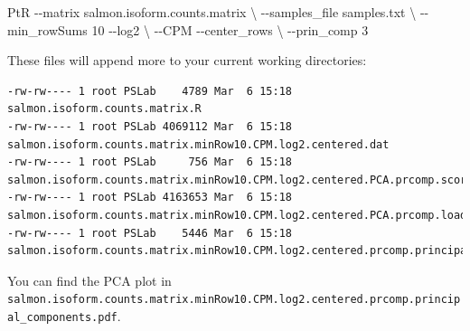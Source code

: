 \documentclass[
  letterpaper,
  DIV=11,
  numbers=noendperiod]{scrreprt}
\newenvironment{Shaded}{\begin{snugshade}}{\end{snugshade}}
\newcommand{\AttributeTok}[1]{\textcolor[rgb]{0.40,0.45,0.13}{#1}}
\newcommand{\DataTypeTok}[1]{\textcolor[rgb]{0.68,0.00,0.00}{#1}}
\newcommand{\ExtensionTok}[1]{\textcolor[rgb]{0.00,0.23,0.31}{#1}}
\newcommand{\NormalTok}[1]{\textcolor[rgb]{0.00,0.23,0.31}{#1}}
\begin{document}
\begin{tcolorbox}[enhanced jigsaw, breakable, bottomrule=.15mm, left=2mm, coltitle=black, opacityback=0, colframe=quarto-callout-note-color-frame, toprule=.15mm, opacitybacktitle=0.6, colbacktitle=quarto-callout-note-color!10!white, bottomtitle=1mm, colback=white, toptitle=1mm, titlerule=0mm, rightrule=.15mm, arc=.35mm, title=\textcolor{quarto-callout-note-color}{\faInfo}\hspace{0.5em}{Activity}, leftrule=.75mm]

\begin{Shaded}
\begin{Highlighting}[]
    \ExtensionTok{PtR} \AttributeTok{{-}{-}matrix}\NormalTok{ salmon.isoform.counts.matrix }\DataTypeTok{\textbackslash{}}
    \AttributeTok{{-}{-}samples\_file}\NormalTok{ samples.txt }\DataTypeTok{\textbackslash{}}
    \AttributeTok{{-}{-}min\_rowSums}\NormalTok{ 10 }\AttributeTok{{-}{-}log2} \DataTypeTok{\textbackslash{}}
    \AttributeTok{{-}{-}CPM} \AttributeTok{{-}{-}center\_rows} \DataTypeTok{\textbackslash{}}
    \AttributeTok{{-}{-}prin\_comp}\NormalTok{ 3}
\end{Highlighting}
\end{Shaded}

\end{tcolorbox}

These files will append more to your current working directories:

\begin{verbatim}
-rw-rw---- 1 root PSLab    4789 Mar  6 15:18 salmon.isoform.counts.matrix.R
-rw-rw---- 1 root PSLab 4069112 Mar  6 15:18 salmon.isoform.counts.matrix.minRow10.CPM.log2.centered.dat
-rw-rw---- 1 root PSLab     756 Mar  6 15:18 salmon.isoform.counts.matrix.minRow10.CPM.log2.centered.PCA.prcomp.scores
-rw-rw---- 1 root PSLab 4163653 Mar  6 15:18 salmon.isoform.counts.matrix.minRow10.CPM.log2.centered.PCA.prcomp.loadings
-rw-rw---- 1 root PSLab    5446 Mar  6 15:18 salmon.isoform.counts.matrix.minRow10.CPM.log2.centered.prcomp.principal_components.pdf
\end{verbatim}

You can find the PCA plot in
\texttt{salmon.isoform.counts.matrix.minRow10.CPM.log2.centered.prcomp.principal\_components.pdf}.
\end{document}
